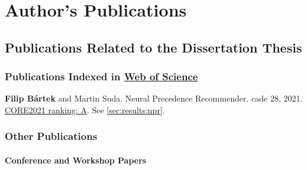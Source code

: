 \chapter{Author's Publications}



\newcommand{\auth}\textbf
\newcommand{\core}[3]{\href{https://portal.core.edu.au/conf-ranks/#3/}{CORE#1 ranking: #2}}


\section{Publications Related to the Dissertation Thesis}

\subsection{Publications Indexed in \href{https://www.webofscience.com/}{Web of Science}}
\label{sec:wos}

\auth{Filip Bártek} and Martin Suda.
Neural Precedence Recommender.
\Gls{cade} 28, 2021.
\cite{DBLP:conf/cade/Bartek021}
\\
\core{2021}{A}{918}. See \cref{sec:results:npr}.

\subsection{Other Publications}

\subsubsection{Conference and Workshop Papers}

